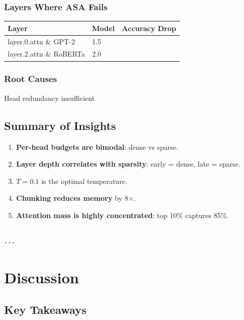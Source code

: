 \subsubsection{Layers Where ASA Fails}

\begin{table}[H]
\centering
\small
\begin{tabular}{lll}
\toprule
\textbf{Layer} & \textbf{Model} & \textbf{Accuracy Drop} \\
\midrule
layer.0.attn \& GPT-2 & 1.5 \\
layer.2.attn \& RoBERTa & 2.0 \\
\bottomrule
\end{tabular}
\end{table}

\subsubsection{Root Causes}

Head redundancy insufficient

\subsection{Summary of Insights}

\begin{enumerate}
\item \textbf{Per-head budgets are bimodal}: dense vs sparse.
\item \textbf{Layer depth correlates with sparsity}: early = dense, late = sparse.
\item \textbf{$T = 0.1$} is the optimal temperature.
\item \textbf{Chunking reduces memory} by 8$\times$.
\item \textbf{Attention mass is highly concentrated}: top 10\% captures 85\%.
\end{enumerate}
\begin{lstlisting}

---
\end{lstlisting}


\section{Discussion}

\subsection{Key Takeaways}

